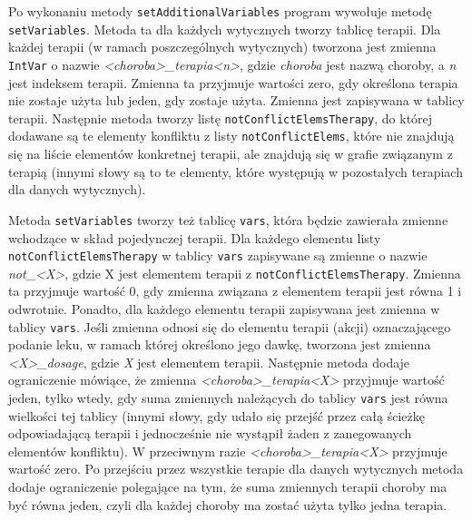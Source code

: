 Po wykonaniu metody \texttt{setAdditionalVariables} program wywołuje metodę \texttt{setVariables}. Metoda ta dla każdych wytycznych tworzy tablicę terapii. Dla każdej terapii (w ramach poszczególnych wytycznych) tworzona jest zmienna \texttt{IntVar} o nazwie \textit{<choroba>\_terapia<n>}, gdzie \textit{choroba} jest nazwą choroby, a \textit{n} jest indeksem terapii. Zmienna ta przyjmuje wartości zero, gdy  określona terapia nie zostaje użyta lub jeden, gdy zostaje użyta. Zmienna jest zapisywana w tablicy terapii. Następnie metoda tworzy listę \texttt{notConflictElemsTherapy}, do której dodawane są te elementy konfliktu z listy \texttt{notConflictElems}, które nie znajdują się na liście elementów konkretnej terapii, ale znajdują się w grafie związanym z terapią (innymi słowy są to te elementy, które występują w pozostałych terapiach dla danych wytycznych). 

Metoda \texttt{setVariables} tworzy też tablicę \texttt{vars}, która będzie zawierała zmienne wchodzące w skład pojedynczej terapii. Dla każdego elementu listy \texttt{notConflictElemsTherapy} w tablicy \texttt{vars} zapisywane są zmienne o nazwie \textit{not\_<X>}, gdzie X jest elementem terapii z \texttt{notConflictElemsTherapy}. Zmienna ta przyjmuje wartość 0, gdy zmienna związana z elementem terapii jest równa 1 i odwrotnie. Ponadto, dla każdego elementu terapii zapisywana jest zmienna w tablicy \texttt{vars}. Jeśli zmienna odnosi się do elementu terapii (akcji) oznaczającego podanie leku, w ramach której określono jego dawkę, tworzona jest zmienna \textit{<X>\_dosage}, gdzie \textit{X} jest elementem terapii. Następnie metoda dodaje ograniczenie mówiące, że zmienna \textit{<choroba>\_terapia<X>} przyjmuje wartość jeden, tylko wtedy, gdy suma zmiennych należących do tablicy \texttt{vars} jest równa wielkości tej tablicy (innymi słowy, gdy udało się przejść przez całą ścieżkę odpowiadającą terapii i jednocześnie nie wystąpił żaden z zanegowanych elementów konfliktu). W przeciwnym razie \textit{<choroba>\_terapia<X>} przyjmuje wartość zero. Po przejściu przez wszystkie terapie dla danych wytycznych metoda dodaje ograniczenie polegające na tym, że suma zmiennych terapii choroby ma być równa jeden, czyli dla każdej choroby ma zostać użyta tylko jedna terapia. 

